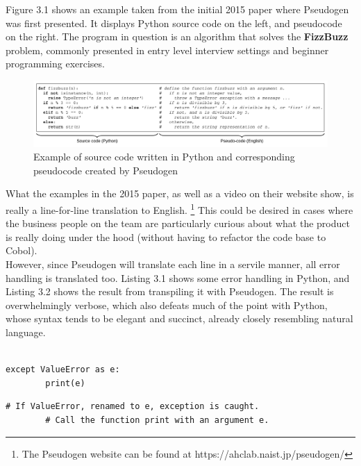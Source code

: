 Figure 3.1 shows an example taken from the initial 2015 paper where Pseudogen was first presented. It displays Python source code on the left, and pseudocode on the right. The program in question is an algorithm that solves the \textbf{FizzBuzz} problem, commonly presented in entry level interview settings and beginner programming exercises. \hfill \\

\begin{figure}[ht]
    \centering
    \includegraphics[scale=0.52]{assets/odaetal.png}
    \caption{Example of source code written in Python and corresponding pseudocode created by Pseudogen}
    \label{fig:odaetal}
\end{figure}

What the examples in the 2015 paper, as well as a video on their website show, is really a line-for-line translation to English. \footnote{The Pseudogen website can be found at https://ahclab.naist.jp/pseudogen/} This could be desired in cases where the business people on the team are particularly curious about what the product is really doing under the hood (without having to refactor the code base to Cobol). \\

However, since Pseudogen will translate each line in a servile manner, all error handling is translated too. Listing 3.1 shows some error handling in Python, and Listing 3.2 shows the result from transpiling it with Pseudogen. The result is overwhelmingly verbose, which also defeats much of the point with Python, whose syntax tends to be elegant and succinct, already closely resembling natural language. \\ \\


\begin{lstlisting}[caption={Error handling in Python}, captionpos=b]
    except ValueError as e:
        print(e)
\end{lstlisting}

\begin{lstlisting}[caption={The result of transpiling the code in Listing ?? with Pseudogen}, captionpos=b]
    # If ValueError, renamed to e, exception is caught.
        # Call the function print with an argument e.
\end{lstlisting}

